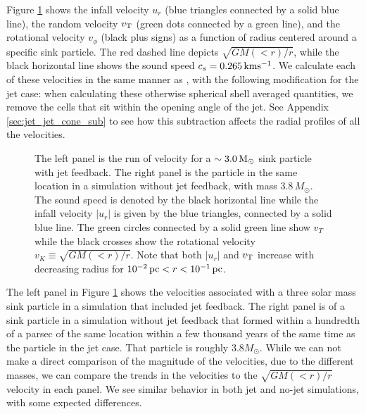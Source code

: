 \documentclass[../dissertation.tex]{subfiles}
\begin{document}
Figure \ref{fig:jet_velocity_profile} shows the infall velocity $u_r$ (blue triangles connected by a solid blue line), the random velocity $v_{\rm T}$ (green dots connected by a green line), and the rotational velocity $v_\phi$ (black plus signs) as a function of radius centered around a specific sink particle.
The red dashed line depicts $\sqrt{GM(<r)/r}$, while the black horizontal line shows the sound speed $c_s = 0.265 {\rm \, kms^{-1}}$.
We calculate each of these velocities in the same manner as \citet{2017MNRAS.465.1316M}, with the following modification for the jet case: when calculating these otherwise spherical shell averaged quantities, we remove the cells that sit within the opening angle of the jet.
See Appendix \ref{sec:jet_jet_cone_sub} to see how this subtraction affects the radial profiles of all the velocities.
%
\begin{figure*}[htb] %
  \caption[Jet - Velocity profile comparison]{The left panel is the run of velocity for a $\sim 3.0 {\rm \, M_\odot}$ sink particle with jet feedback. The right panel is the particle in the same location in a simulation without jet feedback, with mass $3.8 \, M_\odot$. The sound speed is denoted by the black horizontal line while the infall velocity $ \lvert u_r \rvert$ is given by the blue triangles, connected by a solid blue line. The green circles connected by a solid green line show $v_T$ while the black crosses show the rotational velocity $v_K \equiv \sqrt{GM(< r)/r}$. Note that both $\lvert u_r \rvert$ and $v_{\rm T}$ increase with decreasing radius for $10^{-2}{\rm\, pc}<r<10^{-1}{\rm \, pc}$. }
    \label{fig:jet_velocity_profile}
\end{figure*}
%

The left panel in Figure \ref{fig:jet_velocity_profile} shows the velocities associated with a three solar mass sink particle in a simulation that included jet feedback.
The right panel is of a sink particle in a simulation without jet feedback that formed within a hundredth of a parsec of the same location within a few thousand years of the same time as the particle in the jet case.
That particle is roughly $3.8 M_\odot$.
While we can not make a direct comparison of the magnitude of the velocities, due to the different masses, we can compare the trends in the velocities to the $\sqrt{GM(<r)/r}$ velocity in each panel. We see similar behavior in both jet and no-jet simulations, with some expected differences.
\end{document}
